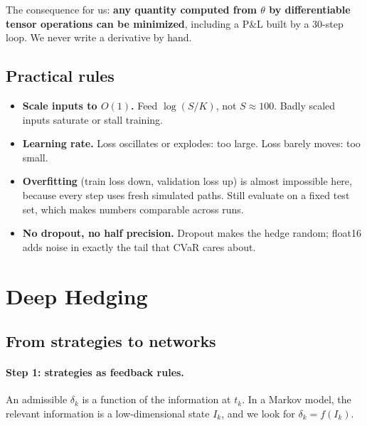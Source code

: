 \documentclass[11pt]{article}
\theoremstyle{definition}
\theoremstyle{remark}
\begin{document}
The consequence for us: \textbf{any quantity computed from $\theta$ by differentiable tensor operations
can be minimized}, including a P\&L built by a 30-step loop. We never write a derivative by hand.

\subsection{Practical rules}

\begin{itemize}[leftmargin=*]
  \item \textbf{Scale inputs to $O(1)$.} Feed $\log(S/K)$, not $S\approx100$. Badly scaled inputs saturate or stall training.
  \item \textbf{Learning rate.} Loss oscillates or explodes: too large. Loss barely moves: too small.
  \item \textbf{Overfitting} (train loss down, validation loss up) is almost impossible here, because every step uses fresh simulated paths. Still evaluate on a fixed test set, which makes numbers comparable across runs.
  \item \textbf{No dropout, no half precision.} Dropout makes the hedge random; float16 adds noise in exactly the tail that CVaR cares about.
\end{itemize}

\section{Deep Hedging}\label{sec:dh}

\subsection{From strategies to networks}

\paragraph{Step 1: strategies as feedback rules.}
An admissible $\delta_k$ is a function of the information at $t_k$. In a Markov model, the relevant
information is a low-dimensional state $I_k$, and we look for $\delta_k=f(I_k)$.
\end{document}
